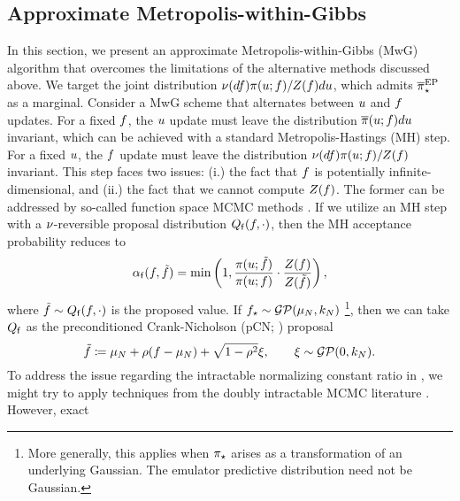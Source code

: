 \documentclass[12pt]{article}
\begin{document}
\subsection{Approximate Metropolis-within-Gibbs}
In this section, we present an approximate Metropolis-within-Gibbs (MwG) algorithm that 
overcomes the limitations of the alternative methods discussed above. We 
target the joint distribution 
$\nu(df) \pi(u; f)/Z(f) du$, which admits
${\overline{\pi}}_{\star}^{\mathrm{EP}}$ as a marginal. Consider a MwG
scheme that alternates between $u$ and $f$ updates. 
For a fixed $f$, the $u$ update must leave the distribution 
$\overline{\pi}(u; f) du$ invariant, which can be achieved 
with a standard Metropolis-Hastings (MH) step. For a fixed $u$, the $f$
update must leave the distribution 
$\nu(df) \pi(u; f)/Z(f)$
invariant. This step faces two issues: (i.) the fact that $f$ is potentially 
infinite-dimensional, and (ii.) the fact that we cannot compute 
$Z(f)$. The former can be addressed by so-called 
function space MCMC methods \citep{functionSpaceMCMC}. If we utilize an
MH step with a $\nu$-reversible proposal distribution 
$Q_{\mathsf{f}}(f, \cdot)$, then the MH acceptance probability reduces to
\begin{equation}
\alpha_{\mathsf{f}}(f, \tilde{f})
= \min\left(1, \frac{\pi(u; \tilde{f})}{\pi(u; f)} \cdot 
\frac{Z(f)}{Z(\tilde{f})} \right),
\label{eq:MH-ratio-mwg}
\end{equation}
where $\tilde{f} \sim Q_{\mathsf{f}}(f, \cdot)$ is the proposed value.
If ${f}_{\star} \sim \mathcal{GP}(\mu_{N}, k_{N})$
\footnote{More generally, this applies when ${\pi}_{\star}$ arises as a transformation
of an underlying Gaussian. The emulator predictive distribution need not be Gaussian.}, 
then we can take $Q_{\mathsf{f}}$ as
the preconditioned Crank-Nicholson (pCN; \citet{functionSpaceMCMC}) proposal
\begin{equation}
\tilde{f} \coloneqq \mu_{N} + \rho (f  - \mu_{N}) + \sqrt{1 - \rho^2} \xi, 
\qquad \xi \sim \mathcal{GP}(0, k_{N}).
\end{equation}
To address the issue regarding the intractable normalizing constant ratio in 
, we might try to apply techniques from the doubly 
intractable MCMC literature \citep{doublyIntractableReview}. However, exact 
\end{document}
